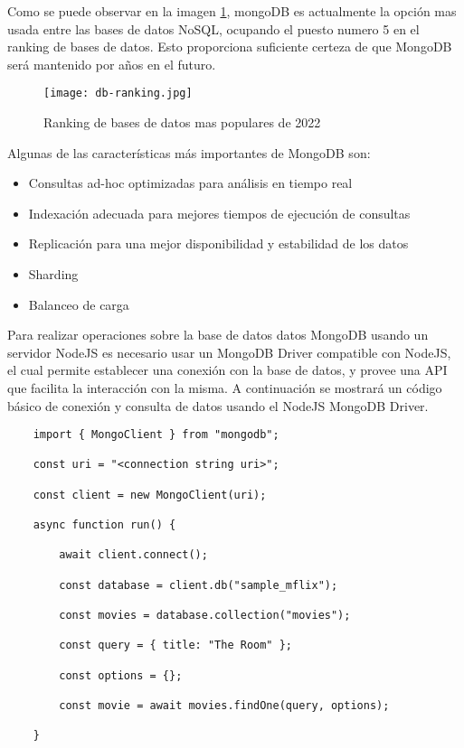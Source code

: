 Como se puede observar en la imagen \ref{fig:db-ranking}, mongoDB es actualmente la opción mas usada entre las bases de datos NoSQL, ocupando el puesto numero 5 en el ranking de bases de datos. Esto proporciona suficiente certeza de que MongoDB será mantenido por años en el futuro.

\begin{figure}[H]
  \texttt{[image: db-ranking.jpg]}
  \caption{Ranking de bases de datos mas populares de 2022}
  \label{fig:db-ranking}
\end{figure}

Algunas de las características más importantes de MongoDB son:

\begin{itemize}
  \item Consultas ad-hoc optimizadas para análisis en tiempo real
  \item Indexación adecuada para mejores tiempos de ejecución de consultas
  \item Replicación para una mejor disponibilidad y estabilidad de los datos
  \item Sharding
  \item Balanceo de carga
\end{itemize}

Para realizar operaciones sobre la base de datos datos MongoDB usando un servidor NodeJS es necesario usar un MongoDB Driver compatible con NodeJS, el cual permite establecer una conexión con la base de datos, y provee una API que facilita la interacción con la misma. A continuación se mostrará un código básico de conexión y consulta de datos usando el NodeJS MongoDB Driver.

\begin{lstlisting}
    import { MongoClient } from "mongodb";

    const uri = "<connection string uri>";

    const client = new MongoClient(uri);

    async function run() {

        await client.connect();

        const database = client.db("sample_mflix");

        const movies = database.collection("movies");

        const query = { title: "The Room" };

        const options = {};

        const movie = await movies.findOne(query, options);

    }
\end{lstlisting}

